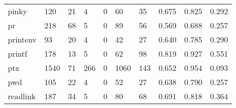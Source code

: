 \begin{longtable}{lp{2.0cm}p{2.0cm}p{2.0cm}p{2.0cm}p{2.0cm}p{2.0cm}p{2.0cm}p{2.0cm}p{2.0cm}}
pinky     &                    120 &                                 21 &                                 4 &                                0 &                                60 &                              35 &                                0.675 &                                  0.825 &                                0.292 \\
pr        &                    218 &                                 68 &                                 5 &                                0 &                                89 &                              56 &                                0.569 &                                  0.688 &                                0.257 \\
printenv  &                     93 &                                 20 &                                 4 &                                0 &                                42 &                              27 &                                0.640 &                                  0.785 &                                0.290 \\
printf    &                    178 &                                 13 &                                 5 &                                0 &                                62 &                              98 &                                0.819 &                                  0.927 &                                0.551 \\
ptx       &                   1540 &                                 71 &                               266 &                                0 &                              1060 &                             143 &                                0.652 &                                  0.954 &                                0.093 \\
pwd       &                    105 &                                 22 &                                 4 &                                0 &                                52 &                              27 &                                0.638 &                                  0.790 &                                0.257 \\
readlink  &                    187 &                                 34 &                                 5 &                                0 &                                80 &                              68 &                                0.691 &                                  0.818 &                                0.364 \\

\end{longtable}
